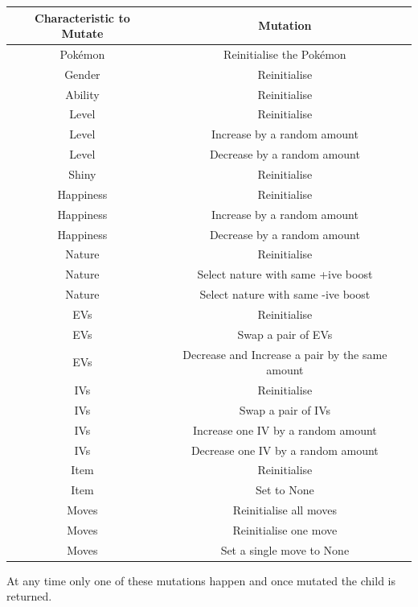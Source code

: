 \documentclass[a4paper]{article}
\newcommand{\Pokemon}{Pok\'{e}mon}
\begin{document}
\begin{center}
    \begin{tabular}{ c | c }
        Characteristic to Mutate & Mutation \\
        \hline
		\Pokemon{} & Reinitialise the \Pokemon{} \\
		Gender & Reinitialise \\
		Ability & Reinitialise \\
		Level & Reinitialise \\
		Level & Increase by a random amount \\
		Level & Decrease by a random amount \\
		Shiny & Reinitialise \\
		Happiness & Reinitialise \\
		Happiness & Increase by a random amount \\
		Happiness & Decrease by a random amount \\
		Nature & Reinitialise \\
		Nature & Select nature with same +ive boost \\
		Nature & Select nature with same -ive boost \\
		EVs & Reinitialise \\
		EVs & Swap a pair of EVs \\
		EVs & Decrease and Increase a pair by the same amount \\
		IVs & Reinitialise \\
		IVs & Swap a pair of IVs \\
		IVs & Increase one IV by a random amount \\
		IVs & Decrease one IV by a random amount \\
		Item & Reinitialise \\
		Item & Set to None \\
		Moves & Reinitialise all moves \\
		Moves & Reinitialise one move \\
		Moves & Set a single move to None \\
    \end{tabular}
\end{center}
\par
At any time only one of these mutations happen and once mutated the child is returned.
\end{document}
